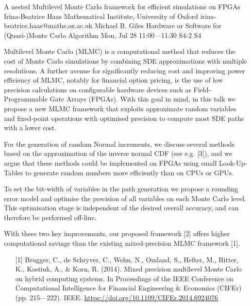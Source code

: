 \begin{talk}
  {A nested Multilevel Monte Carlo framework for efficient simulations on FPGAs}%
  {Irina-Beatrice Haas}%
  {Mathematical Institute, University of Oxford}%
  {irina-beatrice.haas@maths.ox.ac.uk}%
  {Michael B. Giles}%
  {Hardware or Software for (Quasi-)Monte Carlo Algorithm}%
  {Mon, Jul 28 11:00---11:30}%
  {S4-2}%
  {S4}%
    
   

Multilevel Monte Carlo (MLMC) is a computational method that reduces the cost of Monte Carlo simulations by combining SDE approximations with multiple resolutions. A further avenue for significantly reducing cost and improving power efficiency of MLMC, notably for financial option pricing, is the use of low precision calculations on configurable hardware devices such as Field-Programmable Gate Arrays (FPGAs). With this goal in mind, in this talk we propose a new MLMC framework that exploits approximate random variables and fixed-point operations with optimised precision to compute most SDE paths with a lower cost.

For the generation of random Normal increments, we discuss several methods based on the approximation of the inverse normal CDF (see e.g. [3]), and we argue that these methods could be implemented on FPGAs using small Look-Up-Tables to generate random numbers more efficiently than on CPUs or GPUs. 

To set the bit-width of variables in the path generation we propose a rounding error model and optimise the precision of all variables on each Monte Carlo level. This optimisation stage is independent of the desired overall accuracy, and can therefore be performed off-line. 

With these two key improvements, our proposed framework [2] offers higher computational
savings than the existing mixed-precision MLMC framework [1].


\medskip


\begin{enumerate}

    \item[{[1]}] Brugger, C., de Schryver, C., Wehn, N., Omland, S., Hefter, M., Ritter, K., Kostiuk, A., \& Korn, R. (2014). Mixed precision multilevel Monte Carlo on hybrid computing systems. In Proceedings of the IEEE Conference on Computational Intelligence for Financial Engineering \& Economics (CIFEr) (pp. 215---222). IEEE. \url{https://doi.org/10.1109/CIFEr.2014.6924076}
    

\end{enumerate}
\end{talk}
